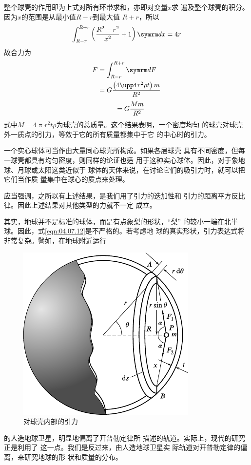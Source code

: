 整个球壳的作用即为上式对所有环带求和，亦即对变量$ x $求
遍及整个球壳的积分。因为$ x $的范围是从最小值$ R - r $到最大值
$ R + r $，所以
\begin{equation}\label{eqn:04.07.11}
  \int _ { R - r } ^ { R + r } \left( \frac { R ^ { 2 } - r ^ { 2 } } { x ^ { 2 } } + 1 \right) \dif x = 4 r
\end{equation}
故合力为
\begin{equation*}
  \begin{aligned}
    F & = \int _ { R - r } ^ { R + r } \dif F                                 \\
      & = G \frac { \left( 4 \uppi r ^ { 2 } \rho t \right) m } { R ^ { 2 } } \\
  \end{aligned}
\end{equation*}
\begin{equation}\label{eqn:04.07.12}
  \mbox \quad = G \frac { M m } { R ^ { 2 } }
\end{equation}
式中$ M = 4 \uppi r ^ { 2 } t \rho $为球壳的总质量。这个结果表明，一个密度均匀
的球壳对球壳外一质点的引力，等效于它的所有质量都集中于它
的中心时的引力。

一个实心球体可当作由大量同心球壳所构成。如果各层球壳
具有不同密度，但每一球壳都具有均匀密度，则同样的论证也适
用于这种实心球体。因此，对于象地球、月球或太阳这类近似于
球体的天体来说，在讨论它们的吸引力时，就可以把它们当作质
量集中在球心的质点来处理。

应当强调，之所以有上述结果，是我们用了引力的迭加性和
引力的距离平方反比律。因此上述结果对其他类型的力就不一定
成立。

其实，地球并不是标准的球体，而是有点象梨的形状，“梨”
的较小一端在北半球。因此，式\eqref{eqn:04.07.12}是不严格的。若考虑地
球的真实形状，引力表达式将非常复杂。譬如，在地球附近运行
\begin{figure}
  \centering
  \includegraphics{figure/fig04.11}
  \caption{对球壳内部的引力}
  \label{fig:04.11}
\end{figure}
的人造地球卫星，明显地偏离了开普勒定律所
描述的轨道。实际上，现代的研究正是利用了
这一点。我们是反过来，由人造地球卫星实
际轨道对开普勒定律的偏离，来研究地球的形
状和质量的分布。

